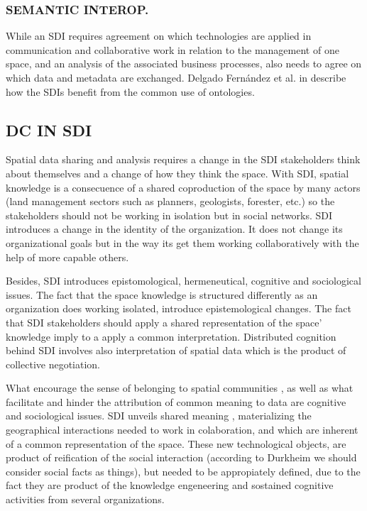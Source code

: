 \documentclass[10pt,twocolumn,ieeetran]{article}
\begin{document}
\subsubsection{SEMANTIC INTEROP.}
While an SDI requires agreement on which technologies are applied in communication and collaborative work in relation to the management of one space, and an analysis of the associated business processes, also needs to agree on which data and metadata are exchanged. Delgado Fern\' andez et al. in \cite{Delgado} describe how the SDIs benefit from the common use of ontologies. 



\subsection{DC IN SDI}

Spatial data sharing and analysis requires a change in the SDI stakeholders think about themselves and a change of how they think the space. With SDI, spatial knowledge is a consecuence of a shared
coproduction of the space by many actors (land management sectors such as planners, geologists, forester, etc.) so the stakeholders should not be working in isolation but in social networks. SDI introduces a change
in the identity of the organization. It does not change its organizational goals but in the way its get them
working collaboratively with the help of more capable others.

Besides, SDI introduces epistomological, hermeneutical, cognitive and sociological issues. The fact that the space knowledge is structured differently as an organization does working isolated, introduce epistemological changes. The fact that SDI stakeholders should apply a shared representation of the space' knowledge imply to a apply a common interpretation. Distributed cognition behind SDI involves also interpretation of spatial data which is the product of collective negotiation. 


What encourage the sense of belonging to spatial communities \cite{Noucher2}, as well as what facilitate and hinder the attribution of common meaning to data \cite{Noucher1} are cognitive and sociological issues. 
SDI unveils shared meaning \cite{Noucher1}, materializing the geographical interactions needed to work in colaboration, and which are inherent of a common representation of the space. 
These new technological objects, are product of reification of the social interaction (according to Durkheim \cite{Durkheim} we should consider social facts as things), but needed to be appropiately defined, due to the fact they are product of the knowledge engeneering and sostained cognitive activities from several organizations. 
\end{document}
